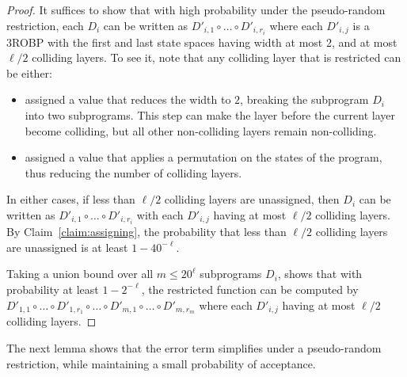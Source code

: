 {\begin{proof}
	It suffices to show that with high probability under the pseudo-random restriction, each $D_i$ can be written as $D'_{i,1} \circ \ldots \circ D'_{i,r_i}$ where each $D'_{i,j}$ is a 3ROBP with the first and last state spaces having width at most 2, and at most $\ell/2$ colliding layers.
To see it, note that any colliding layer that is restricted can be either:
	\begin{itemize}
		\item assigned a value that reduces the width to $2$, breaking the subprogram $D_i$ into two subprograms. This step can make the layer before the current layer become colliding, but all other non-colliding layers remain non-colliding.
		\item assigned a value that applies a permutation on the states of the program, thus reducing the number of colliding layers.
	\end{itemize} 
		In either cases, if less than $\ell/2$ colliding layers are unassigned, then $D_i$ can be written as $D'_{i,1} \circ \ldots \circ D'_{i,r_i}$ with each $D'_{i,j}$ having at most $\ell/2$ colliding layers.
	By Claim~\ref{claim:assigning}, the probability that less than $\ell/2$ colliding layers are unassigned is at least $1-40^{-\ell}$.

	
	Taking a union bound over all $m\le 20^{\ell}$ subprograms $D_i$, shows that with probability at least $1-2^{-\ell}$, the restricted function can be computed by 
	$D'_{1,1} \circ \ldots \circ D'_{1,r_1} \circ \ldots \circ D'_{m,1} \circ \ldots \circ D'_{m,r_m}$ 
	where each $D'_{i,j}$ having at most $\ell/2$ colliding layers.
\end{proof}


The next lemma shows that the error term simplifies under a pseudo-random restriction, while maintaining a small probability of acceptance.

}
